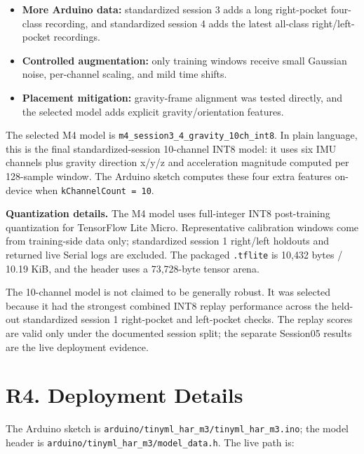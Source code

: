 \documentclass[11pt,a4paper]{article}
\newcommand{\term}[1]{\textbf{#1}}
\begin{document}
\begin{itemize}
\item \term{More Arduino data:} standardized session 3 adds a long right-pocket four-class recording, and standardized session 4 adds the latest all-class right/left-pocket recordings.
\item \term{Controlled augmentation:} only training windows receive small Gaussian noise, per-channel scaling, and mild time shifts.
\item \term{Placement mitigation:} gravity-frame alignment was tested directly, and the selected model adds explicit gravity/orientation features.
\end{itemize}

The selected M4 model is \texttt{m4\_session3\_4\_gravity\_10ch\_int8}. In plain language, this is the final standardized-session 10-channel INT8 model: it uses six IMU channels plus gravity direction x/y/z and acceleration magnitude computed per 128-sample window. The Arduino sketch computes these four extra features on-device when \texttt{kChannelCount = 10}.

\textbf{Quantization details.} The M4 model uses full-integer INT8 post-training quantization for TensorFlow Lite Micro. Representative calibration windows come from training-side data only; standardized session 1 right/left holdouts and returned live Serial logs are excluded. The packaged \texttt{.tflite} is 10,432 bytes / 10.19 KiB, and the header uses a 73,728-byte tensor arena.

The 10-channel model is not claimed to be generally robust. It was selected because it had the strongest combined INT8 replay performance across the held-out standardized session 1 right-pocket and left-pocket checks. The replay scores are valid only under the documented session split; the separate Session05 results are the live deployment evidence.

\section{R4. Deployment Details}

The Arduino sketch is \texttt{arduino/tinyml\_har\_m3/tinyml\_har\_m3.ino}; the model header is \texttt{arduino/tinyml\_har\_m3/model\_data.h}. The live path is:
\end{document}
